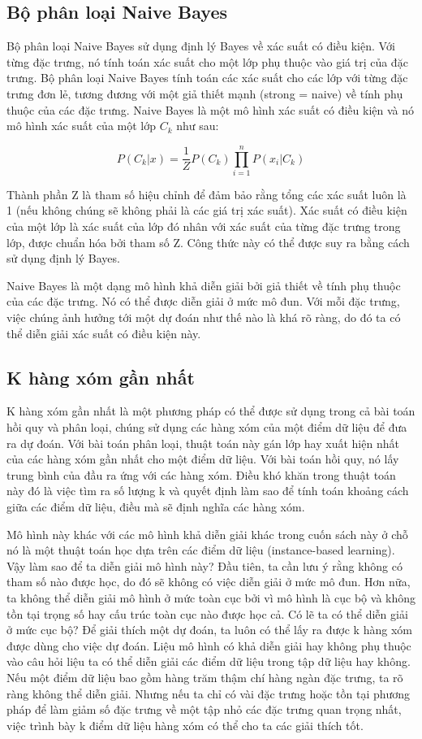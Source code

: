 \subsection{Bộ phân loại Naive Bayes}

Bộ phân loại Naive Bayes sử dụng định lý Bayes về xác suất có điều kiện. Với từng đặc trưng, nó tính toán xác suất cho một lớp phụ thuộc vào giá trị của đặc trưng. Bộ phân loại Naive Bayes tính toán các xác suất cho các lớp với từng đặc trưng đơn lẻ, tương đương với một giả thiết mạnh (strong = naive) về tính phụ thuộc  của các đặc trưng. Naive Bayes là một mô hình xác suất có điều kiện và nó mô hình xác suất của một lớp $C_k$ như sau:

$$P(C_k|x)=\frac{1}{Z}P(C_k)\prod_{i=1}^n{}P(x_i|C_k)$$

Thành phần Z là tham số hiệu chỉnh để đảm bảo rằng tổng các xác suất luôn là 1 (nếu không chúng sẽ không phải là các giá trị xác suất). Xác suất có điều kiện của một lớp là xác suất của lớp đó nhân với xác suất của từng đặc trưng trong lớp, được chuẩn hóa bởi tham số Z. Công thức này có thể được suy ra bằng cách sử dụng định lý Bayes.

Naive Bayes là một dạng mô hình khả diễn giải bởi giả thiết về tính phụ thuộc của các đặc trưng. Nó có thể được diễn giải ở mức mô đun. Với mỗi đặc trưng,  việc chúng ảnh hưởng tới một dự đoán như thế nào là khá rõ ràng, do đó ta có thể diễn giải xác suất có điều kiện này.

\subsection{K hàng xóm gần nhất}

K hàng xóm gần nhất là một phương pháp có thể được sử dụng trong cả bài toán hồi quy và phân loại, chúng sử dụng các hàng xóm của một điểm dữ liệu để đưa ra dự đoán. Với bài toán phân loại, thuật toán này gán lớp hay xuất hiện nhất của các hàng xóm gần nhất cho một điểm dữ liệu. Với bài toán hồi quy, nó lấy trung bình của đầu ra ứng với các hàng xóm. Điều khó khăn trong thuật toán này đó là việc tìm ra số lượng k và quyết định làm sao để tính toán khoảng cách giữa các điểm dữ liệu, điều mà sẽ định nghĩa các hàng xóm.

Mô hình này khác với các mô hình khả diễn giải khác trong cuốn sách này ở chỗ nó là một thuật toán học dựa trên các điểm dữ liệu (instance-based learning). Vậy làm sao để ta diễn giải mô hình này? Đầu tiên, ta cần lưu ý rằng không có tham số nào được học, do đó sẽ không có việc diễn giải ở mức mô đun. Hơn nữa, ta không thể diễn giải mô hình ở mức toàn cục bởi vì mô hình là cục bộ và không tồn tại trọng số hay cấu trúc toàn cục nào được học cả. Có lẽ ta có thể diễn giải ở mức cục bộ? Để giải thích một dự đoán, ta luôn có thể lấy ra được k hàng xóm được dùng cho việc dự đoán. Liệu mô hình có khả diễn giải hay không phụ thuộc vào câu hỏi liệu ta có thể diễn giải các điểm dữ liệu trong tập dữ liệu hay không. Nếu một điểm dữ liệu bao gồm hàng trăm thậm chí hàng ngàn đặc trưng, ta rõ ràng không thể diễn giải. Nhưng nếu ta chỉ có vài đặc trưng hoặc tồn tại phương pháp để làm giảm số đặc trưng về một tập nhỏ các đặc trưng quan trọng nhất, việc trình bày k điểm dữ liệu hàng xóm có thể cho ta các giải thích tốt.
